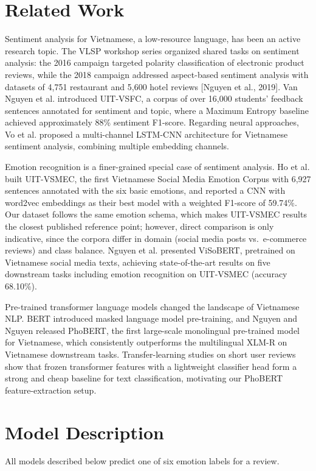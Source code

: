 \documentclass[11pt]{article}
\begin{document}
\section{Related Work}
Sentiment analysis for Vietnamese, a low-resource language, has been an active research topic. The VLSP workshop series organized shared tasks on sentiment analysis: the 2016 campaign targeted polarity classification of electronic product reviews, while the 2018 campaign addressed aspect-based sentiment analysis with datasets of 4,751 restaurant and 5,600 hotel reviews [Nguyen et al., 2019]. Van Nguyen et al. introduced UIT-VSFC, a corpus of over 16,000 students' feedback sentences annotated for sentiment and topic, where a Maximum Entropy baseline achieved approximately 88\% sentiment F1-score. Regarding neural approaches, Vo et al. proposed a multi-channel LSTM-CNN architecture for Vietnamese sentiment analysis, combining multiple embedding channels.

Emotion recognition is a finer-grained special case of sentiment analysis. Ho et al. built UIT-VSMEC, the first Vietnamese Social Media Emotion Corpus with 6,927 sentences annotated with the six basic emotions, and reported a CNN with word2vec embeddings as their best model with a weighted F1-score of 59.74\%. Our dataset follows the same emotion schema, which makes UIT-VSMEC results the closest published reference point; however, direct comparison is only indicative, since the corpora differ in domain (social media posts vs.\ e-commerce reviews) and class balance. Nguyen et al. presented ViSoBERT, pretrained on Vietnamese social media texts, achieving state-of-the-art results on five downstream tasks including emotion recognition on UIT-VSMEC (accuracy 68.10\%).

Pre-trained transformer language models changed the landscape of Vietnamese NLP. BERT introduced masked language model pre-training, and Nguyen and Nguyen released PhoBERT, the first large-scale monolingual pre-trained model for Vietnamese, which consistently outperforms the multilingual XLM-R on Vietnamese downstream tasks. Transfer-learning studies on short user reviews show that frozen transformer features with a lightweight classifier head form a strong and cheap baseline for text classification, motivating our PhoBERT feature-extraction setup.

\section{Model Description}
All models described below predict one of six emotion labels for a review.
\end{document}

